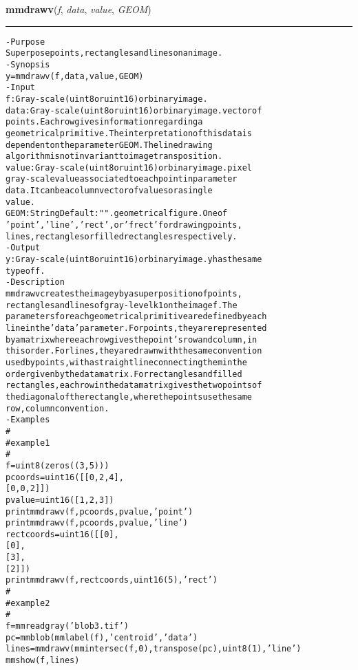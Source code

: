    \begin{boxedminipage}{\textwidth}

    \raggedright \textbf{mmdrawv}(\textit{f}, \textit{data}, \textit{value}, \textit{GEOM})

    \vspace{-1.5ex}

    \rule{\textwidth}{0.5\fboxrule}
\begin{alltt}
- Purpose
    Superpose points, rectangles and lines on an image.
- Synopsis
    y = mmdrawv(f, data, value, GEOM)
- Input
    f:     Gray-scale (uint8 or uint16) or binary image.
    data:  Gray-scale (uint8 or uint16) or binary image. vector of
           points. Each row gives information regarding a
           geometrical primitive. The interpretation of this data is
           dependent on the parameter GEOM. The line drawing
           algorithm is not invariant to image transposition.
    value: Gray-scale (uint8 or uint16) or binary image. pixel
           gray-scale value associated to each point in parameter
           data. It can be a column vector of values or a single
           value.
    GEOM:  String Default: "". geometrical figure. One of
           'point','line', 'rect', or 'frect' for drawing points,
           lines, rectangles or filled rectangles respectively.
- Output
    y: Gray-scale (uint8 or uint16) or binary image. y has the same
       type of f .
- Description
    mmdrawv creates the image y by a superposition of points,
    rectangles and lines of gray-level k1 on the image f . The
    parameters for each geometrical primitive are defined by each
    line in the 'data' parameter. For points , they are represented
    by a matrix where each row gives the point's row and column, in
    this order. For lines , they are drawn with the same convention
    used by points, with a straight line connecting them in the
    order given by the data matrix. For rectangles and filled
    rectangles , each row in the data matrix gives the two points of
    the diagonal of the rectangle, where the points use the same
    row, column convention.
- Examples
    \#
    \#   example 1
    \#
    f=uint8(zeros((3,5)))
    pcoords=uint16([[0,2,4],
                    [0,0,2]])
    pvalue=uint16([1,2,3])
    print mmdrawv(f,pcoords,pvalue,'point')
    print mmdrawv(f,pcoords,pvalue,'line')
    rectcoords=uint16([[0],
                       [0],
                       [3],
                       [2]])
    print mmdrawv(f,rectcoords, uint16(5), 'rect')
    \#
    \#   example 2
    \#
    f=mmreadgray('blob3.tif')
    pc=mmblob(mmlabel(f),'centroid','data')
    lines=mmdrawv(mmintersec(f,0),transpose(pc),uint8(1),'line')
    mmshow(f,lines)\end{alltt}

    \vspace{1ex}

    \end{boxedminipage}


